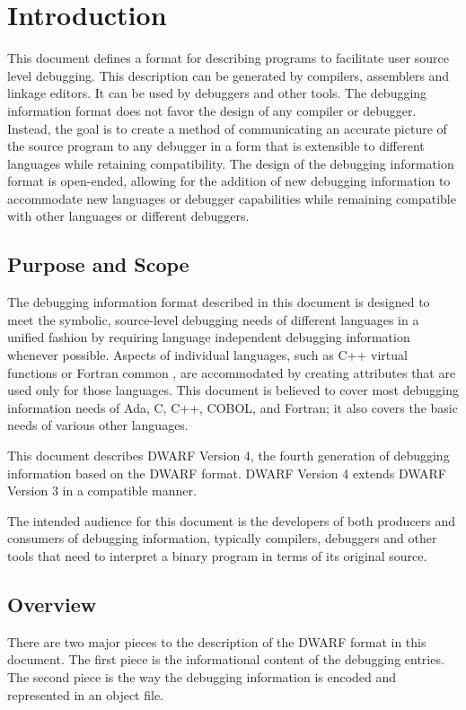 \chapter{Introduction}
\label{chap:introduction}
This document defines a format for describing programs to
facilitate user source level debugging. This description
can be generated by compilers, assemblers and linkage
editors. 
It can be used by debuggers and other tools. 
The
debugging information format does not favor the design of any
compiler or debugger. 
Instead, the goal is to create a method
of communicating an accurate picture of the source program
to any debugger in a form that is extensible to different
languages while retaining compatibility.  
The design of the
debugging information format is open-ended, allowing for
the addition of new debugging information to accommodate new
languages or debugger capabilities while remaining compatible
with other languages or different debuggers.

\section{Purpose and Scope}
The debugging information format described in this document is
designed to meet the symbolic, source-level debugging needs of
different languages in a unified fashion by requiring language
independent debugging information whenever possible.  
Aspects
of individual languages, such as C++ virtual functions or
Fortran common , are accommodated by creating attributes
that are used only for those languages. 
This document is
believed to cover most debugging information needs of Ada,
C, C++, COBOL, and Fortran; it also covers the basic needs
of various other languages.

This document describes DWARF Version 4, the fourth generation
of debugging information based on the DWARF format. DWARF
Version 4 extends DWARF Version 3 in a compatible manner.

The intended audience for this document is the developers
of both producers and consumers of debugging information,
typically compilers, debuggers and other tools that need to
interpret a binary program in terms of its original source.

\section{Overview}


There are two major pieces to the description of the DWARF
format in this document. The first piece is the informational
content of the debugging entries. The second piece is the
way the debugging information is encoded and represented in
an object file.

